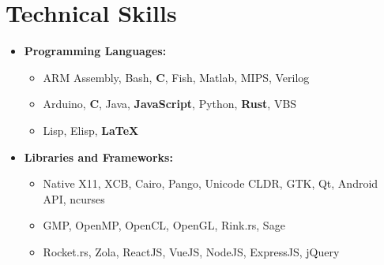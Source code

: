 \documentclass[10pt,letterpaper,sans]{moderncv}
\renewcommand{\_}{\textscale{.7}{\textunderscore}}
\newcommand{\Rplus}{\protect\hspace{-.1em}\protect\raisebox{.35ex}{\smaller{\smaller\textbf{+}}}}
\newcommand{\Cpp}{\mbox{C\Rplus\Rplus}\xspace}
\begin{document}
\section{Technical Skills}
\begin{itemize}
\item \textbf{Programming Languages:}
  \begin{itemize}
    \item {} ARM Assembly, Bash, \textbf{C}, Fish, Matlab, MIPS, Verilog
    \item {} Arduino, \textbf{\Cpp}, Java, \textbf{JavaScript}, Python, \textbf{Rust}, VBS
    \item {} Lisp, Elisp, \textbf{\LaTeX}
  \end{itemize}
\item \textbf{Libraries and Frameworks:} 
  \begin{itemize}
  \item {} Native X11, XCB, Cairo, Pango, Unicode CLDR,
    GTK, Qt, Android API, ncurses
  \item {} GMP, OpenMP, OpenCL, OpenGL, Rink.rs, Sage
  \item {} Rocket.rs, Zola, ReactJS, VueJS, NodeJS, ExpressJS, jQuery
  \end{itemize}
\end{itemize}
\end{document}
